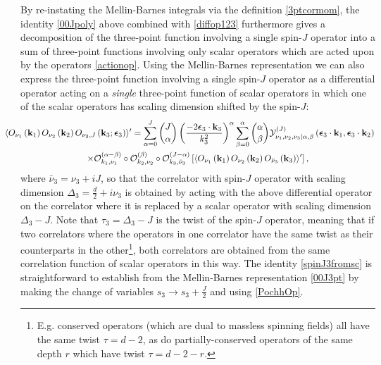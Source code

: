 \documentclass[11pt,a4paper]{article}
\begin{document}
By re-instating the Mellin-Barnes integrals via the definition \eqref{3ptcormom}, the identity \eqref{00Jpoly} above combined with \eqref{diffop123} furthermore gives a decomposition of the three-point function involving a single spin-$J$ operator into a sum of three-point functions involving only scalar operators which are acted upon by the operators \eqref{actionop}. Using the Mellin-Barnes representation we can also express the three-point function involving a single spin-$J$ operator as a differential operator acting on a \emph{single} three-point function of scalar operators in which one of the scalar operators has scaling dimension shifted by the spin-$J$:
\begin{multline}\label{spinJ3fromsc}
   \hspace*{-0.65cm} \langle O_{\nu_1}\left({\bf k}_1\right)O_{\nu_2}\left({\bf k}_2\right)O_{\nu_3,J}\left({\bf k}_3;\boldsymbol{\epsilon}_3\right)  \rangle^\prime  =\sum^J_{\alpha=0}\binom{J}{\alpha} \left(\frac{-2 \boldsymbol{\epsilon}_3 \cdot {\bf k}_3}{k^2_3}\right)^\alpha \sum^\alpha_{\beta=0}\binom{\alpha}{\beta} {\cal Y}^{\left(J\right)}_{\nu_1,\nu_2,\nu_3|\alpha,\beta}\left(\boldsymbol{\epsilon}_3 \cdot {\bf k}_1,\boldsymbol{\epsilon}_3 \cdot {\bf k}_2\right)\\ \times \mathcal{O}_{k_1,\nu_1}^{(\alpha-\beta)}\circ\mathcal{O}_{k_2,\nu_2}^{(\beta)}\circ\mathcal{O}_{k_3,\bar{\nu}_3}^{(J-\alpha)}\left[ \langle O_{\nu_1}\left({\bf k}_1\right)O_{\nu_2}\left({\bf k}_2\right)O_{{\bar \nu}_3}\left({\bf k}_3\right)  \rangle^\prime\right],
\end{multline}
where $\bar{\nu}_3=\nu_3+iJ$, so that the correlator with spin-$J$ operator with scaling dimension $\Delta_3 = \frac{d}{2}+i\nu_3$ is obtained by acting with the above differential operator on the correlator where it is replaced by a scalar operator with scaling dimension $\Delta_3 -J$. Note that $\tau_3 = \Delta_3 -J$ is the twist of the spin-$J$ operator, meaning that if two correlators where the operators in one correlator have the same twist as their counterparts in the other\footnote{E.g. conserved operators (which are dual to massless spinning fields) all have the same twist $\tau = d-2$, as do partially-conserved operators of the same depth $r$ which have twist $\tau=d-2-r$.}, both correlators are obtained from the same correlation function of scalar operators in this way. The identity \eqref{spinJ3fromsc} is straightforward to establish from the Mellin-Barnes representation \eqref{00J3pt} by making the change of variables $s_3 \to s_3 + \frac{J}{2}$ and using \eqref{PochhOp}.
\end{document}
